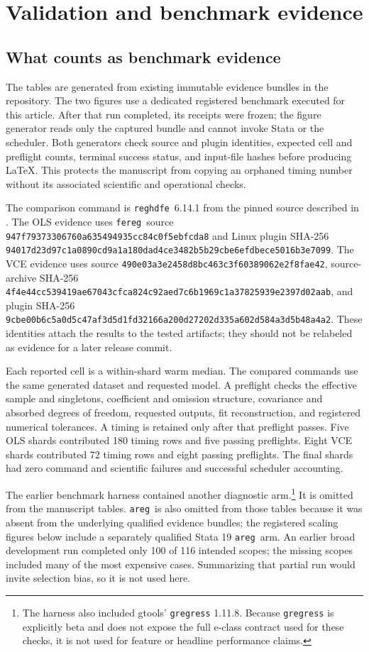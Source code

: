 \documentclass[11pt]{article}
\newcommand{\fereg}{\texttt{fereg}}
\newcommand{\reghdfe}{\texttt{reghdfe}}
\newcommand{\areg}{\texttt{areg}}
\begin{document}
\section{Validation and benchmark evidence}
\label{sec:benchmarks}

\subsection{What counts as benchmark evidence}

The tables are generated from existing immutable evidence bundles in the
repository.  The two figures use a dedicated registered benchmark executed
for this article.  After that run completed, its receipts were frozen; the
figure generator reads only the captured bundle and cannot invoke Stata or the
scheduler.  Both generators check source and plugin identities, expected cell
and preflight counts, terminal success status, and input-file hashes before
producing LaTeX.  This protects the manuscript from copying an orphaned
timing number without its associated scientific and operational checks.

The comparison command is \reghdfe\ 6.14.1 from the pinned source described in
.  The OLS evidence uses \fereg\ source
\texttt{947f79373306760a635494935cc84c0f5ebfcda8} and Linux plugin SHA-256
\texttt{94017d23d97c1a0890cd9a1a180dad4ce3482b5b29cbe6efdbece5016b3e7099}.
The VCE evidence uses source
\texttt{490e03a3e2458d8bc463c3f60389062e2f8fae42}, source-archive SHA-256
\texttt{4f4e44cc539419ae67043cfca824c92aed7c6b1969c1a37825939e2397d02aab},
and plugin SHA-256
\texttt{9cbe00b6c5a0d5c47af3d5d1fd32166a200d27202d335a602d584a3d5b48a4a2}.
These identities attach the results to the tested artifacts; they should not
be relabeled as evidence for a later release commit.

Each reported cell is a within-shard warm median.  The compared commands use
the same generated dataset and requested model.  A preflight checks the
effective sample and singletons, coefficient and omission structure,
covariance and absorbed degrees of freedom, requested outputs, fit
reconstruction, and registered numerical tolerances.  A timing is retained
only after that preflight passes.  Five OLS shards contributed 180 timing rows
and five passing preflights.  Eight VCE shards contributed 72 timing rows and
eight passing preflights.  The final shards had zero command and scientific
failures and successful scheduler accounting.

The earlier benchmark harness contained another diagnostic arm.\footnote{The harness
also included gtools' \texttt{gregress} 1.11.8.  Because
\texttt{gregress} is explicitly beta and does not expose the full e-class
contract used for these checks, it is not used for feature or headline
performance claims.}  It is omitted from the manuscript tables.  \areg\ is
also omitted from those tables because it was absent from the underlying
qualified evidence bundles; the registered scaling figures below include a
separately qualified Stata 19 \areg\ arm.
An earlier broad development run completed only 100 of 116 intended scopes;
the missing scopes included many of the most expensive cases.  Summarizing
that partial run would invite selection bias, so it is not used here.
\end{document}
